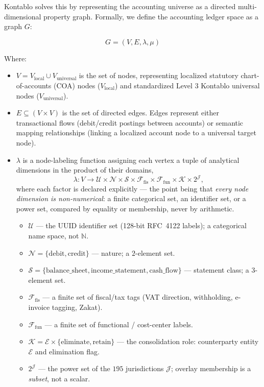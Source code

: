 Kontablo solves this by representing the accounting universe as a directed multi-dimensional property graph. Formally, we define the accounting ledger space as a graph $G$:

\[ G = (V, E, \lambda, \mu) \]

Where:
\begin{itemize}
    \item $V = V_{\text{local}} \cup V_{\text{universal}}$ is the set of nodes, representing localized statutory chart-of-accounts (COA) nodes ($V_{\text{local}}$) and standardized Level 3 Kontablo universal nodes ($V_{\text{universal}}$).
    \item $E \subseteq (V \times V)$ is the set of directed edges. Edges represent either transactional flows (debit/credit postings between accounts) or semantic mapping relationships (linking a localized account node to a universal target node).
    \item $\lambda$ is a node-labeling function assigning each vertex a tuple of analytical dimensions in the product of their domains,
    \[
    \lambda: V \rightarrow \mathcal{U} \times \mathcal{N} \times \mathcal{S} \times \mathcal{F}_{\mathrm{fis}} \times \mathcal{F}_{\mathrm{fun}} \times \mathcal{K} \times 2^{\mathcal{J}},
    \]
    where each factor is declared explicitly --- the point being that \emph{every node dimension is non-numerical}: a finite categorical set, an identifier set, or a power set, compared by equality or membership, never by arithmetic.
    \begin{itemize}
        \item $\mathcal{U}$ --- the UUID identifier set (128-bit RFC~4122 labels); a categorical name space, not $\mathbb{N}$.
        \item $\mathcal{N} = \{\text{debit}, \text{credit}\}$ --- nature; a $2$-element set.
        \item $\mathcal{S} = \{\text{balance\_sheet}, \text{income\_statement}, \text{cash\_flow}\}$ --- statement class; a $3$-element set.
        \item $\mathcal{F}_{\mathrm{fis}}$ --- a finite set of fiscal/tax tags (VAT direction, withholding, e-invoice tagging, Zakat).
        \item $\mathcal{F}_{\mathrm{fun}}$ --- a finite set of functional / cost-center labels.
        \item $\mathcal{K} = \mathcal{E} \times \{\text{eliminate}, \text{retain}\}$ --- the consolidation role: counterparty entity $\mathcal{E}$ and elimination flag.
        \item $2^{\mathcal{J}}$ --- the power set of the $195$ jurisdictions $\mathcal{J}$; overlay membership is a \emph{subset}, not a scalar.

\end{itemize}
\end{itemize}
